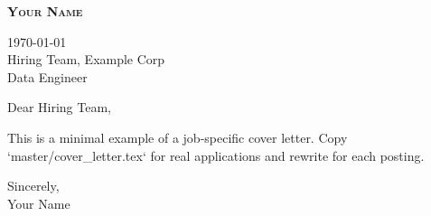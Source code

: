 \documentclass[letterpaper,11pt]{article}
\begin{document}
\begin{center}\textbf{\Huge \scshape Your Name}\end{center}
\vspace{12pt}
\today \\
\vspace{8pt}
Hiring Team, Example Corp \\
Data Engineer

Dear Hiring Team,

This is a minimal example of a job-specific cover letter. Copy `master/cover_letter.tex` for real applications and rewrite for each posting.

Sincerely, \\
Your Name
\end{document}

